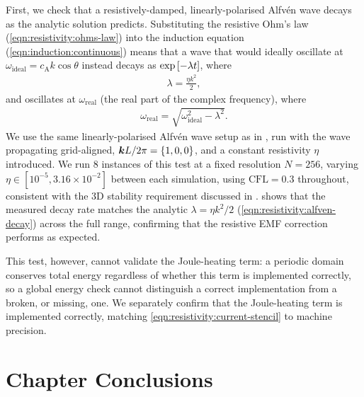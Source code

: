 First, we check that a resistively-damped, linearly-polarised Alfv\'en wave decays as the analytic solution predicts. Substituting the resistive Ohm's law (\cref{eqn:resistivity:ohms-law}) into the induction equation (\cref{eqn:induction:continuous}) means that a wave that would ideally oscillate at $\omega_\mathrm{ideal} = c_\mathrm{A} k \cos\theta$ instead decays as $\exp\left[ -\lambda t \right]$, where
\begin{align}
    \lambda
        = \frac{\eta k^2}{2}
    , \label{eqn:resistivity:alfven-decay}
\end{align}
and oscillates at $\omega_\mathrm{real}$ (the real part of the complex frequency), where
\begin{align}
    \omega_\mathrm{real}
        = \sqrt{\omega_\mathrm{ideal}^2 - \lambda^2}
    . \label{eqn:resistivity:alfven-frequency}
\end{align}
We use the same linearly-polarised Alfv\'en wave setup as in , run with the wave propagating grid-aligned, $\bm{k}L/2\pi = \{1,0,0\}$, and a constant resistivity $\eta$ introduced. We run $8$ instances of this test at a fixed resolution $N = 256$, varying $\eta \in [10^{-5}, 3.16 \times 10^{-2}]$ between each simulation, using $\mathrm{CFL} = 0.3$ throughout, consistent with the 3D stability requirement discussed in .  shows that the measured decay rate matches the analytic $\lambda = \eta k^2/2$ (\cref{eqn:resistivity:alfven-decay}) across the full range, confirming that the resistive EMF correction performs as expected.

This test, however, cannot validate the Joule-heating term: a periodic domain conserves total energy regardless of whether this term is implemented correctly, so a global energy check cannot distinguish a correct implementation from a broken, or missing, one. We separately confirm that the Joule-heating term is implemented correctly, matching \cref{eqn:resistivity:current-stencil} to machine precision.


\section{Chapter Conclusions}
\label{sec:conclusions}

